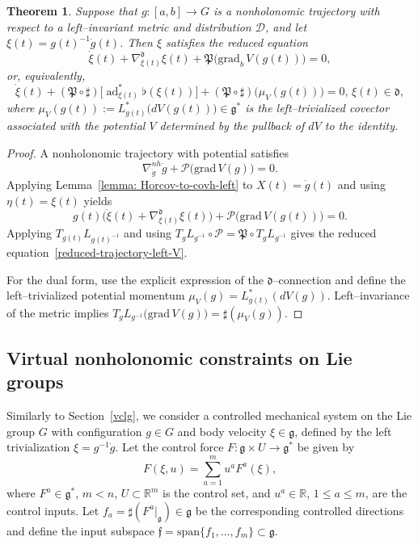 \documentclass[letterpaper, 10 pt, conference]{ieeeconf}
\newtheorem{theorem}{Theorem}
\newcommand{\g}{\mathfrak{g}}
\newcommand{\h}{\mathfrak{d}}
\newcommand{\D}{\mathcal{D}}
\begin{document}
\begin{theorem}
Suppose that $g: [a,b] \to G$ is a nonholonomic trajectory with respect to a 
left--invariant metric and distribution $\D$, and let 
$\xi(t) = g(t)^{-1}\dot{g}(t)$.  
Then $\xi$ satisfies the reduced equation
\begin{equation}\label{reduced-trajectory-left-V}
    \dot{\xi}(t) + \nabla^{\h}_{\xi(t)}\xi(t)
    + \mathfrak{P}\Big(
       \mathrm{grad}_b\,V(g(t))  \Big)
    = 0,
\end{equation}
or, equivalently,
\begin{equation}\label{reduced-trajectory-left-V-dual}
    \dot{\xi}(t) 
    + (\mathfrak{P} \circ \sharp)
      \big[ \operatorname{ad}^{*}_{\xi(t)}\flat(\xi(t))\big]
    + (\mathfrak{P}\circ\sharp)\big(\mu_V(g(t))\big)
    = 0,
    \, \xi(t)\in \h,
\end{equation}
where $\mu_V(g(t)) 
:= L_{g(t)}^{*}\big(dV(g(t))\big)\in\g^{*}$ is the left--trivialized covector associated with the potential $V$ determined by the pullback of $dV$ to the identity.
\end{theorem}

\begin{proof}
A nonholonomic trajectory with potential satisfies
\[
\nabla^{nh}_{\dot g}\dot g + \mathcal{P}\big(\mathrm{grad}\,V(g)\big)=0.
\]
Applying Lemma~\ref{lemma: Horcov-to-covh-left} to $X(t)=\dot g(t)$ and using 
$\eta(t)=\xi(t)$ yields
\[
g(t)\big(\dot\xi(t)+\nabla^\h_{\xi(t)}\xi(t)\big)
+ \mathcal{P}\big(\mathrm{grad}\,V(g(t))\big)=0.
\]
Applying $T_{g(t)}L_{g(t)^{-1}}$ and using 
$T_gL_{g^{-1}}\circ\mathcal{P}=\mathfrak{P}\circ T_gL_{g^{-1}}$ gives the reduced equation~\eqref{reduced-trajectory-left-V}.

For the dual form, use the explicit expression of the $\h$--connection and 
define the left--trivialized potential momentum 
$\mu_V(g)=L_{g(t)}^{*}(dV(g))$.  
Left--invariance of the metric implies $ T_gL_{g^{-1}}\big(\mathrm{grad}\,V(g)\big)=\sharp(\mu_V(g))$.
\end{proof}

\subsection{Virtual nonholonomic constraints on Lie groups}\label{sec5.1}

Similarly to Section~\ref{vclg}, we consider a controlled mechanical system on the Lie group $G$ 
with configuration $g\in G$ and body velocity $\xi\in\mathfrak{g}$, defined by the left trivialization $\xi = g^{-1}\dot g$. Let the control force $F:\mathfrak{g}\times U \rightarrow \mathfrak{g}^{*}$ be given by
\begin{equation}
    F(\xi,u) = \sum_{a=1}^{m} u^{a}F^{a}(\xi),
\end{equation}
where $F^{a}\in\mathfrak{g}^{*}$, $m<n$, $U\subset\mathbb{R}^{m}$ is the control set, 
and $u^{a}\in\mathbb{R}$, $1\leq a\leq m$, are the control inputs. 
Let $f_a = \sharp(F^a|_{\g})\in\g$ be the corresponding controlled directions and define the input subspace $\mathfrak{f} = \mathrm{span}\{f_{1},\dots,f_{m}\}\subset\mathfrak{g}$.
\end{document}
